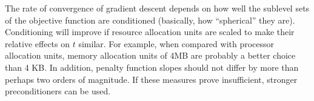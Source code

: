 The rate of convergence of gradient descent depends on how well the sublevel sets of the objective function
are conditioned (basically, how “spherical” they are).
Conditioning will improve if resource allocation units are scaled to make their relative effects on $t$ similar.
For example, when compared with processor allocation units,
memory allocation units of 4MB are probably a better choice than 4 KB.
In addition, penalty function slopes should not differ by more than perhaps two orders of magnitude.
If these measures prove insufficient, stronger preconditioners can be used.

